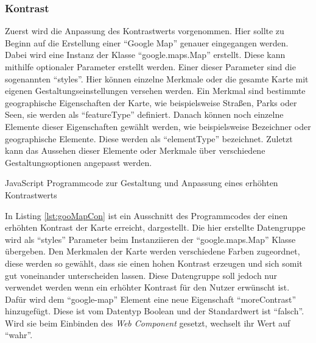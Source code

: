 \documentclass[12pt, paper=a4, bibtotoc, toc=listof, headsepline=true]{scrreprt}
\begin{document}
	\subsubsection{Kontrast}
	Zuerst wird die Anpassung des Kontrastwerts vorgenommen. Hier sollte zu Beginn auf die Erstellung einer \enquote{Google Map} genauer eingegangen werden. Dabei wird eine Instanz der Klasse \enquote{google.maps.Map} erstellt. Diese kann mithilfe optionaler Parameter erstellt werden. Einer dieser Parameter sind die sogenannten \enquote{styles}. Hier können einzelne Merkmale oder die gesamte Karte mit eigenen Gestaltungseinstellungen versehen werden. Ein Merkmal sind bestimmte geographische Eigenschaften der Karte, wie beispielsweise Straßen, Parks oder Seen, sie werden als \enquote{featureType} definiert. Danach können noch einzelne Elemente dieser Eigenschaften gewählt werden, wie beispielsweise Bezeichner oder geographische Elemente. Diese werden als \enquote{elementType} bezeichnet. Zuletzt kann das Aussehen dieser Elemente oder Merkmale über verschiedene Gestaltungsoptionen angepasst werden\cite{gmapStyle}.
\begin{listing}[H]
		\caption[Anpassung zur Erhöhung des Kontrastwerts]{JavaScript Programmcode zur Gestaltung und Anpassung eines erhöhten Kontrastwerts}
		\label{lst:gooMapCon}
\end{listing}
In Listing \ref{lst:gooMapCon} ist ein Ausschnitt des Programmcodes der einen erhöhten Kontrast der Karte erreicht, dargestellt. Die hier erstellte Datengruppe wird als \enquote{styles} Parameter beim Instanziieren der \enquote{google.maps.Map} Klasse übergeben. Den Merkmalen der Karte werden verschiedene Farben zugeordnet, diese werden so gewählt, dass sie einen hohen Kontrast erzeugen und sich somit gut voneinander unterscheiden lassen. Diese Datengruppe soll jedoch nur verwendet werden wenn ein erhöhter Kontrast für den Nutzer erwünscht ist. Dafür wird dem \enquote{google-map} Element eine neue Eigenschaft \enquote{moreContrast} hinzugefügt. Diese ist vom Datentyp Boolean und der Standardwert ist \enquote{falsch}. Wird sie beim Einbinden des \emph{Web Component} gesetzt, wechselt ihr Wert auf \enquote{wahr}. 
\end{document}
